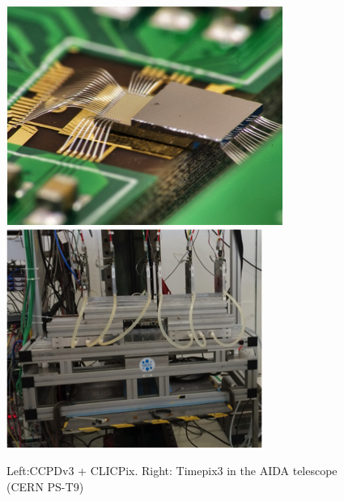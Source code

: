 \begin{figure}
    \centering
    \includegraphics[width=.4\textwidth]{VertexDetector/CLICPIX/ccpdv3_clicpix.png}
    \includegraphics[width=.4\textwidth]{VertexDetector/CLICPIX/timepix3_telescope.png}
    \caption{Left:CCPDv3 + CLICPix. Right: Timepix3 in the AIDA telescope (CERN PS-T9)}
    \label{fig:VertexDetector:clicpix}
\end{figure}
